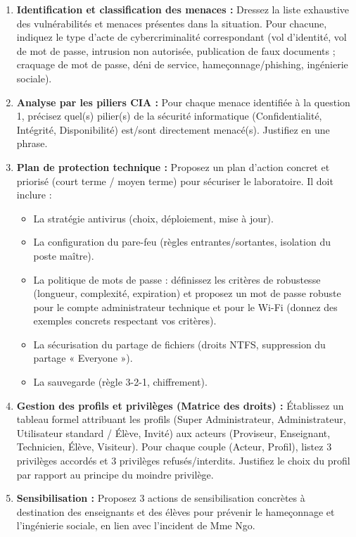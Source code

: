 \documentclass[11pt]{article}
\begin{document}
\begin{enumerate}
    \item \textbf{Identification et classification des menaces :} Dressez la liste exhaustive des vulnérabilités et menaces présentes dans la situation. Pour chacune, indiquez le type d'acte de cybercriminalité correspondant (vol d'identité, vol de mot de passe, intrusion non autorisée, publication de faux documents ; craquage de mot de passe, déni de service, hameçonnage/phishing, ingénierie sociale).
    \item \textbf{Analyse par les piliers CIA :} Pour chaque menace identifiée à la question 1, précisez quel(s) pilier(s) de la sécurité informatique (Confidentialité, Intégrité, Disponibilité) est/sont directement menacé(s). Justifiez en une phrase.
    \item \textbf{Plan de protection technique :} Proposez un plan d'action concret et priorisé (court terme / moyen terme) pour sécuriser le laboratoire. Il doit inclure :
    \begin{itemize}
        \item La stratégie antivirus (choix, déploiement, mise à jour).
        \item La configuration du pare-feu (règles entrantes/sortantes, isolation du poste maître).
        \item La politique de mots de passe : définissez les critères de robustesse (longueur, complexité, expiration) et proposez un mot de passe robuste pour le compte administrateur technique et pour le Wi-Fi (donnez des exemples concrets respectant vos critères).
        \item La sécurisation du partage de fichiers (droits NTFS, suppression du partage « Everyone »).
        \item La sauvegarde (règle 3-2-1, chiffrement).
    \end{itemize}
    \item \textbf{Gestion des profils et privilèges (Matrice des droits) :} Établissez un tableau formel attribuant les profils (Super Administrateur, Administrateur, Utilisateur standard / Élève, Invité) aux acteurs (Proviseur, Enseignant, Technicien, Élève, Visiteur). Pour chaque couple (Acteur, Profil), listez 3 privilèges accordés et 3 privilèges refusés/interdits. Justifiez le choix du profil par rapport au principe du moindre privilège.
    \item \textbf{Sensibilisation :} Proposez 3 actions de sensibilisation concrètes à destination des enseignants et des élèves pour prévenir le hameçonnage et l'ingénierie sociale, en lien avec l'incident de Mme Ngo.
\end{enumerate}
\end{document}
